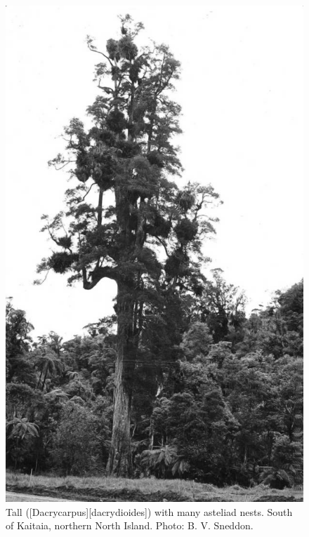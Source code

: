 \begin{figure}[t]
	\begin{minipage}[t]{\textwidth}
		\begin{minipage}[t]{(\textwidth-\fgap) * \real{0.446}}
			\centering
			\includegraphics[width=\textwidth]{graphics/fig_039}
			\caption[Tall kahikatea with many asteliad nests]{Tall  ([Dacrycarpus][dacrydioides]) with many asteliad nests.
			South of Kaitaia, northern North Island.
			Photo: B. V. Sneddon.}%

\end{minipage}
\end{minipage}
\end{figure}
